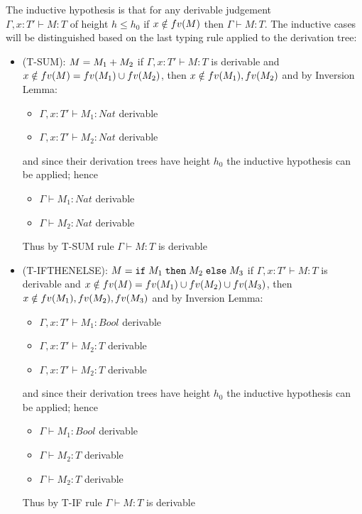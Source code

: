The inductive hypothesis is that for any derivable judgement\\
$\Gamma, x: T' \vdash M: T$ of height $h \le h_0$ if $x \notin fv(M)$ then $\Gamma \vdash M: T$.
The inductive cases will be distinguished based on the last typing rule applied to the
derivation tree:
\begin{itemize}
	\item (T-SUM): $M = M_1+M_2$
	      if $\Gamma, x: T' \vdash M: T$ is derivable and $x \notin fv(M) = fv(M_1)\cup fv(M_2)$,
	      then $x \notin fv(M_1), fv(M_2)$ and by Inversion Lemma:
	      \begin{itemize}
		      \item $\Gamma, x: T' \vdash M_1 : Nat$ derivable
		      \item $\Gamma, x: T' \vdash M_2 : Nat$ derivable
	      \end{itemize}
	      and since their derivation trees have height $h_0$ the inductive hypothesis can be applied;
	      hence
	      \begin{itemize}
		      \item $\Gamma \vdash M_1 : Nat$ derivable
		      \item $\Gamma \vdash M_2 : Nat$ derivable
	      \end{itemize}
	      Thus by T-SUM rule $\Gamma \vdash M: T$ is derivable
	\item (T-IFTHENELSE): $M = \texttt{if}\;M_1\;\texttt{then}\;M_2\;\texttt{else}\;M_3$
	      if $\Gamma, x: T' \vdash M: T$ is derivable and
	      $x \notin fv(M) = fv(M_1)\cup fv(M_2)\cup fv(M_3)$, then
	      $x \notin fv(M_1), fv(M_2), fv(M_3)$ and by Inversion Lemma:
	      \begin{itemize}
		      \item $\Gamma, x: T' \vdash M_1 : Bool$ derivable
		      \item $\Gamma, x: T' \vdash M_2 : T$ derivable
		      \item $\Gamma, x: T' \vdash M_2 : T$ derivable
	      \end{itemize}
	      and since their derivation trees have height $h_0$ the inductive hypothesis can be applied;
	      hence
	      \begin{itemize}
		      \item $\Gamma \vdash M_1 : Bool$ derivable
		      \item $\Gamma \vdash M_2 : T$ derivable
		      \item $\Gamma \vdash M_2 : T$ derivable
	      \end{itemize}
	      Thus by T-IF rule $\Gamma \vdash M: T$ is derivable

\end{itemize}

